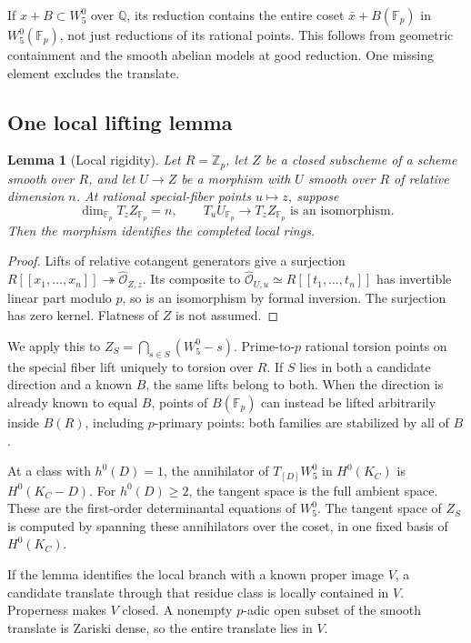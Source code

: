 \documentclass[11pt,a4paper]{article}
\newcommand{\Q}{\mathbb Q}
\newcommand{\F}{\mathbb F}
\newcommand{\Z}{\mathbb Z}
\newcommand{\W}{W^0_5}
\newtheorem{lemma}[theorem]{Lemma}
\begin{document}
If $x+B\subset\W$ over $\Q$, its reduction contains the entire coset
$\bar x+B(\F_p)$ in $\W(\F_p)$, not just reductions of its rational
points. This follows from geometric containment and the smooth abelian
models at good reduction. One missing element excludes the translate.

\subsection{One local lifting lemma}\label{sec:local}
\begin{lemma}[Local rigidity]\label{lem:local}
Let $R=\Z_p$, let $Z$ be a closed subscheme of a scheme smooth over $R$,
and let $U\to Z$ be a morphism with $U$ smooth over $R$ of relative
dimension $n$. At rational special-fiber points $u\mapsto z$, suppose
\[
 \dim_{\F_p}T_z Z_{\F_p}=n,\qquad
 T_u U_{\F_p}\longrightarrow T_z Z_{\F_p}\text{ is an isomorphism}.
\]
Then the morphism identifies the completed local rings.
\end{lemma}
\begin{proof}
Lifts of relative cotangent generators give a surjection
$R[[x_1,\ldots,x_n]]\twoheadrightarrow\widehat{\mathcal O}_{Z,z}$.
Its composite to $\widehat{\mathcal O}_{U,u}\simeq R[[t_1,\ldots,t_n]]$
has invertible linear part modulo $p$, so is an isomorphism by formal
inversion. The surjection has zero kernel. Flatness of $Z$ is not assumed.
\end{proof}

We apply this to $Z_S=\bigcap_{s\in S}(\W-s)$.
Prime-to-$p$ rational torsion points on the special fiber lift uniquely
to torsion over $R$. If $S$ lies in both a candidate direction and a
known $B$, the same lifts belong to both.
When the direction is already known to equal $B$, points of $B(\F_p)$
can instead be lifted arbitrarily inside $B(R)$, including $p$-primary
points: both families are stabilized by all of $B$.

At a class with $h^0(D)=1$, the annihilator of $T_{[D]}\W$ in $H^0(K_C)$
is $H^0(K_C-D)$. For $h^0(D)\ge2$, the tangent space is the full ambient
space. These are the first-order determinantal equations of $W^0_5$.
The tangent space of $Z_S$ is computed by spanning these annihilators
over the coset, in one fixed basis of $H^0(K_C)$.

If the lemma identifies the local branch with a known proper image $V$,
a candidate translate through that residue class is locally contained
in $V$. Properness makes $V$ closed. A nonempty $p$-adic open subset
of the smooth translate is Zariski dense, so the entire translate lies in $V$.
\end{document}
